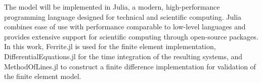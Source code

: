 The model will be implemented in Julia, a modern, high-performance programming language designed for technical and scientific computing. Julia combines ease of use with performance comparable to low-level languages and provides extensive support for scientific computing through open-source packages. In this work, Ferrite.jl is used for the finite element implementation, DifferentialEquations.jl for the time integration of the resulting systems, and MethodOfLines.jl to construct a finite difference implementation for validation of the finite element model.





